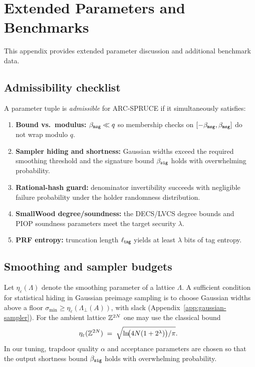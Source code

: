 \section{Extended Parameters and Benchmarks}
\label{app:ext-params}

This appendix provides extended parameter discussion and additional benchmark data.

\subsection{Admissibility checklist}
A parameter tuple is \emph{admissible} for ARC-SPRUCE if it simultaneously satisfies:
\begin{enumerate}[leftmargin=1.25em]
  \item \textbf{Bound vs.\ modulus:} \(\beta_{\mathtt{msg}} \ll q\) so membership checks on \([-\beta_{\mathtt{msg}},\beta_{\mathtt{msg}}]\) do not wrap modulo \(q\).
  \item \textbf{Sampler hiding and shortness:} Gaussian widths exceed the required smoothing threshold and the signature
  bound \(\beta_{\mathtt{sig}}\) holds with overwhelming probability.
  \item \textbf{Rational-hash guard:} denominator invertibility succeeds with negligible failure probability under the
  holder randomness distribution.
  \item \textbf{SmallWood degree/soundness:} the DECS/LVCS degree bounds and PIOP soundness parameters meet the target
  security \(\lambda\).
  \item \textbf{PRF entropy:} truncation length \(\ell_{\mathsf{tag}}\) yields at least \(\lambda\) bits of tag entropy.
\end{enumerate}

\subsection{Smoothing and sampler budgets}
Let \(\eta_\varepsilon(\Lambda)\) denote the smoothing parameter of a lattice \(\Lambda\). A sufficient condition for
statistical hiding in Gaussian preimage sampling is to choose Gaussian widths above a floor
\(\sigma_{\min}\ge \eta_\varepsilon(\Lambda_\perp(A))\), with slack (Appendix~\ref{app:gaussian-sampler}).
For the ambient lattice \(\mathbb{Z}^{2N}\) one may use the classical bound
\[
  \eta_\varepsilon(\mathbb{Z}^{2N})
  \;=\;
  \sqrt{\ln\!\bigl(4N(1+2^\lambda)\bigr)/\pi}.
\]
In our tuning, trapdoor quality \(\alpha\) and acceptance parameters are chosen so that the output shortness bound
\(\beta_{\mathtt{sig}}\) holds with overwhelming probability.

